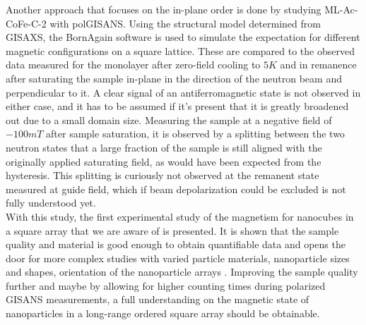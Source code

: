 \documentclass[\main/dresen_thesis.tex]{subfiles}
\begin{document}
  Another approach that focuses on the in-plane order is done by studying ML-Ac-CoFe-C-2 with polGISANS.
  Using the structural model determined from GISAXS, the BornAgain software is used to simulate the expectation for different magnetic configurations on a square lattice.
  These are compared to the observed data measured for the monolayer after zero-field cooling to $5 \unit{K}$ and in remanence after saturating the sample in-plane in the direction of the neutron beam and perpendicular to it.
  A clear signal of an antiferromagnetic state is not observed in either case, and it has to be assumed if it's present that it is greatly broadened out due to a small domain size.
  Measuring the sample at a negative field of $-100 \unit{mT}$ after sample saturation, it is observed by a splitting between the two neutron states that a large fraction of the sample is still aligned with the originally applied saturating field, as would have been expected from the hysteresis.
  This splitting is curiously not observed at the remanent state measured at guide field, which if beam depolarization could be excluded is not fully understood yet.
  \\

  With this study, the first experimental study of the magnetism for nanocubes in a square array that we are aware of is presented.
  It is shown that the sample quality and material is good enough to obtain quantifiable data and opens the door for more complex studies with varied particle materials, nanoparticle sizes and shapes, orientation of the nanoparticle arrays \etc.
  Improving the sample quality further and maybe by allowing for higher counting times during polarized GISANS measurements, a full understanding on the magnetic state of nanoparticles in a long-range ordered square array should be obtainable.
\end{document}
